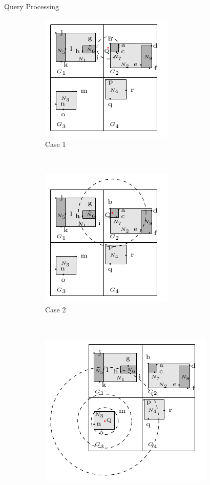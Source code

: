 \documentclass[xcolor={dvipsnames},aspectratio=169,10pt]{beamer}
\begin{document}
\begin{frame}{Query Processing}
  \vspace{-2ex}
  \begin{figure}
    \centering
    \begin{subfigure}[b]{.33\linewidth}
      \centering
      \includegraphics[width=.6\linewidth]{figs/knn/case1.pdf}
      \caption{Case 1}
    \end{subfigure}~%
    \begin{subfigure}[b]{.33\linewidth}
      \centering
      \includegraphics[width=.6\linewidth]{figs/knn/case2.pdf}
      \caption{Case 2}
    \end{subfigure}~%
    \begin{subfigure}[b]{.313\linewidth}
      \centering
      \includegraphics[width=.6\linewidth]{figs/knn/specialcase.pdf}

\end{subfigure}
\end{figure}
\end{frame}
\end{document}
